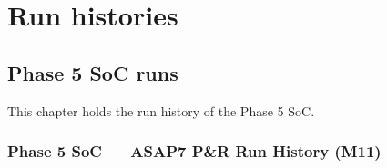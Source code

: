 \part{Run histories}\label{cr:part:run-histories}

\chapter{Phase 5 SoC runs}\label{cr:ch:phase-5-soc-runs}

This chapter holds the run history of the Phase 5 SoC.

\section{Phase 5 SoC --- ASAP7 P\&R Run History (M11)}\label{cr:run:phase5}


